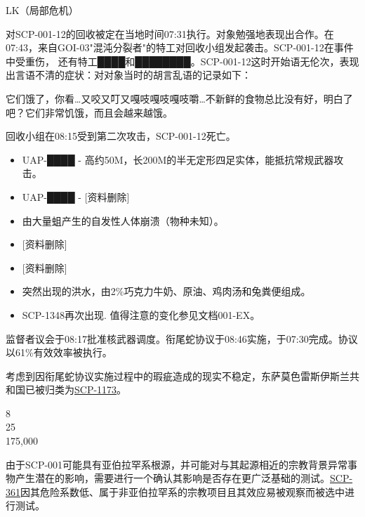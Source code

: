 LK（局部危机）

对SCP-001-12的回收被定在当地时间07:31执行。对象勉强地表现出合作。在07:43，来自GOI-03"混沌分裂者"的特工对回收小组发起袭击。SCP-001-12在事件中受重伤， 还有特工████和████████。SCP-001-12这时开始语无伦次，表现出言语不清的症状：对对象当时的胡言乱语的记录如下：

\begin{scpbox}

它们饿了，你看…又咬又叮又嘎吱嘎吱嘎吱嚼…不新鲜的食物总比没有好，明白了吧？它们非常饥饿，而且会越来越饿。

\end{scpbox}

回收小组在08:15受到第二次攻击，SCP-001-12死亡。


\begin{itemize}
\item UAP-████ - 高约50M，长200M的半无定形四足实体，能抵抗常规武器攻击。
\item UAP-████ - {[}资料删除]
\item 由大量蛆产生的自发性人体崩溃（物种未知）。
\item {[}资料删除]
\item {[}资料删除]
\item 突然出现的洪水，由2\%巧克力牛奶、原油、鸡肉汤和兔粪便组成。
\item SCP-1348再次出现. 值得注意的变化参见文档001-EX。
\end{itemize}

监督者议会于08:17批准核武器调度。衔尾蛇协议于08:46实施，于07:30完成。协议以61\%有效效率被执行。

考虑到因衔尾蛇协议实施过程中的瑕疵造成的现实不稳定，东萨莫色雷斯伊斯兰共和国已被归类为\hyperref[chap:SCP-1173]{SCP-1173}。

8\\
25\\
175,000





由于SCP-001可能具有亚伯拉罕系根源，并可能对与其起源相近的宗教背景异常事物产生潜在的影响，需要进行一个确认其影响是否存在更广泛基础的测试。\hyperref[chap:SCP-361]{SCP-361}因其危险系数低、属于非亚伯拉罕系的宗教项目且其效应易被观察而被选中进行测试。

